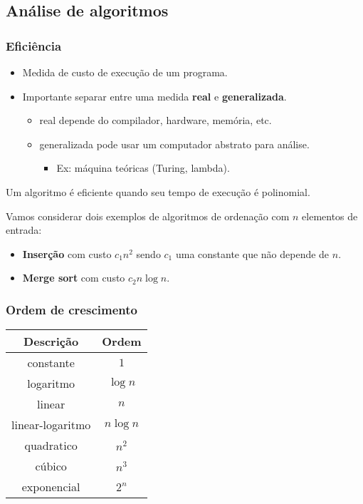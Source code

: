 \subsection{Análise de algoritmos}

\subsubsection{Eficiência}

\begin{itemize}
\item Medida de custo de execução de um programa.
\item Importante separar entre uma medida {\bf real}  e {\bf generalizada}.
	\begin{itemize}
	\item real depende do compilador, hardware, memória, etc.
	\item generalizada pode usar um computador abstrato para análise.
		\begin{itemize}
		\item Ex: máquina teóricas (Turing, lambda).
		\end{itemize}
	\end{itemize}
\end{itemize}

\begin{framed}
\centering
Um algoritmo é eficiente quando seu tempo de execução é polinomial.
\end{framed}

Vamos considerar dois exemplos de algoritmos de ordenação com $n$ elementos de entrada:
\begin{itemize}
\item {\bf Inserção} com custo $c_1 n^2$ sendo $c_1$ uma constante que não depende de $n$.
\item {\bf Merge sort} com custo $c_2 n \log n$. 
\end{itemize}


\subsubsection{Ordem de crescimento}

\begin{table}[ht]
\centering
\begin{tabular}{cc}
\hline
{\bf Descrição} & {\bf Ordem} \\ 
\hline
constante        & $1$ \\
logaritmo        & $\log n$ \\
linear           & $n$ \\
linear-logaritmo & $n \log n$ \\
quadratico       & $n^2$ \\
cúbico           & $n^3$ \\
exponencial      & $2^n$ \\
\hline
\end{tabular}
\end{table}

